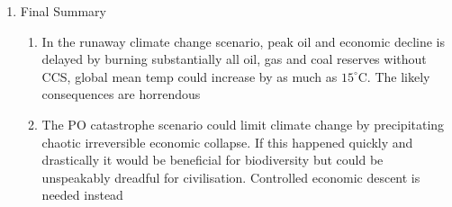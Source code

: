 \documentclass[12pt]{article}
\begin{document}
\begin{enumerate}
      \item Final Summary

        \begin{enumerate}
            
          \item In the runaway climate change scenario, peak oil and economic decline is delayed by burning substantially all oil, gas and coal reserves without CCS, global mean temp could increase by as much as $15^{\circ}$C. The likely consequences are horrendous

          \item The PO catastrophe scenario could limit climate change by precipitating chaotic irreversible economic collapse. If this happened quickly and drastically it would be beneficial for biodiversity but could be unspeakably dreadful for civilisation. Controlled economic descent is needed instead

        \end{enumerate}

    \end{enumerate}
\end{document}
